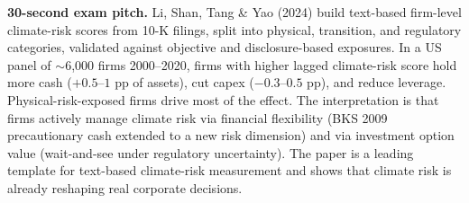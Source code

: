 \documentclass[11pt]{article}
\begin{document}
\begin{keybox}
\textbf{30-second exam pitch.} Li, Shan, Tang \& Yao (2024) build text-based firm-level climate-risk scores from 10-K filings, split into physical, transition, and regulatory categories, validated against objective and disclosure-based exposures. In a US panel of $\sim$6{,}000 firms 2000--2020, firms with higher lagged climate-risk score hold more cash ($+0.5$--$1$ pp of assets), cut capex ($-0.3$--$0.5$ pp), and reduce leverage. Physical-risk-exposed firms drive most of the effect. The interpretation is that firms actively manage climate risk via financial flexibility (BKS 2009 precautionary cash extended to a new risk dimension) and via investment option value (wait-and-see under regulatory uncertainty). The paper is a leading template for text-based climate-risk measurement and shows that climate risk is already reshaping real corporate decisions.
\end{keybox}
\end{document}
